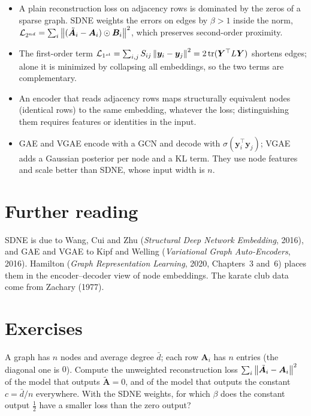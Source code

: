 \begin{notechapter}
\begin{chaptersummary}
\begin{itemize}
\item A plain reconstruction loss on adjacency rows is dominated by the zeros of a sparse graph. SDNE weights the errors on edges by $\beta > 1$ inside the norm, $\mathcal L_{2^{nd}} = \sum_i\left\|(\tilde{\bm A}_i - \bm A_i)\odot\bm B_i\right\|^2$, which preserves second-order proximity.
\item The first-order term $\mathcal L_{1^{st}} = \sum_{i,j}S_{ij}\left\|\bm y_i - \bm y_j\right\|^2 = 2\operatorname{tr}(\bm Y^\top L\bm Y)$ shortens edges; alone it is minimized by collapsing all embeddings, so the two terms are complementary.
\item An encoder that reads adjacency rows maps structurally equivalent nodes (identical rows) to the same embedding, whatever the loss; distinguishing them requires features or identities in the input.
\item GAE and VGAE encode with a GCN and decode with $\sigma(\bm y_i^\top\bm y_j)$; VGAE adds a Gaussian posterior per node and a KL term. They use node features and scale better than SDNE, whose input width is $n$.
\end{itemize}
\end{chaptersummary}

\section*{Further reading}
SDNE is due to Wang, Cui and Zhu (\emph{Structural Deep Network Embedding}, 2016), and GAE and VGAE to Kipf and Welling (\emph{Variational Graph Auto-Encoders}, 2016). Hamilton (\emph{Graph Representation Learning}, 2020, Chapters~3 and~6) places them in the encoder--decoder view of node embeddings. The karate club data come from Zachary (1977).

\section*{Exercises}

\begin{exercise}\label{graph-autoencoders:exr:1}
A graph has $n$ nodes and average degree $\bar d$; each row $\bm A_i$ has $n$ entries (the diagonal one is $0$). Compute the unweighted reconstruction loss $\sum_i\left\|\tilde{\bm A}_i - \bm A_i\right\|^2$ of the model that outputs $\tilde{\bm A} = 0$, and of the model that outputs the constant $c = \bar d/n$ everywhere. With the SDNE weights, for which $\beta$ does the constant output $\frac12$ have a smaller loss than the zero output?
\end{exercise}


\end{notechapter}
